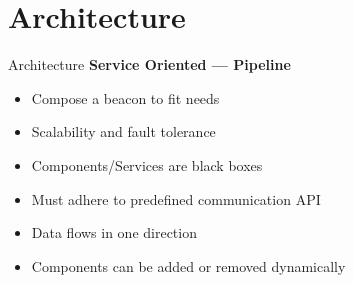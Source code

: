 \section{Architecture}

\begin{frame}[t]{Architecture}
    \textbf{Service Oriented --- Pipeline}
    \begin{itemize}
        \item Compose a beacon to fit needs
        \item Scalability and fault tolerance
        \item Components/Services are black boxes
        \item Must adhere to predefined communication API
        \item Data flows in one direction
        \item Components can be added or removed dynamically
    \end{itemize}
\end{frame}

